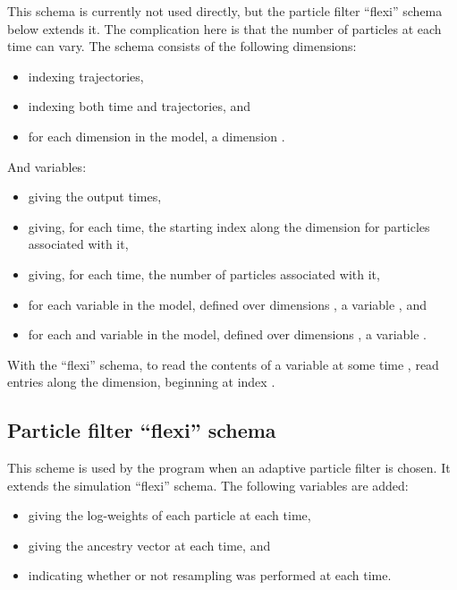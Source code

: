 This schema is currently not used directly, but the particle filter ``flexi''
schema below extends it. The complication here is that the number of
particles at each time can vary. The schema consists of the following
dimensions:
\begin{itemize}
\item {} indexing trajectories,
\item {} indexing both time and trajectories, and
\item for each dimension  in the model, a dimension
  .
\end{itemize}
And variables:
\begin{itemize}
\item {} giving the output times,
\item {} giving, for each time, the starting index along the
   dimension for particles associated with it,
\item {} giving, for each time, the number of particles associated
  with it,
\item for each  variable  in the model,
  defined over dimensions , a variable
  , and
\item for each  and  variable  in the
  model, defined over dimensions , a variable
  .
\end{itemize}

\begin{tip}
With the ``flexi'' schema, to read the contents of a variable at some time
, read  entries along the 
dimension, beginning at index .
\end{tip}

\subsection{Particle filter ``flexi'' schema}

This scheme is used by the  program when an adaptive
particle filter is chosen. It extends the simulation ``flexi'' schema. The
following variables are added:
\begin{itemize}
\item {} giving the log-weights of each particle at each
  time,
\item {} giving the ancestry vector at each time, and
\item {} indicating whether or not resampling was performed
  at each time.
\end{itemize}

